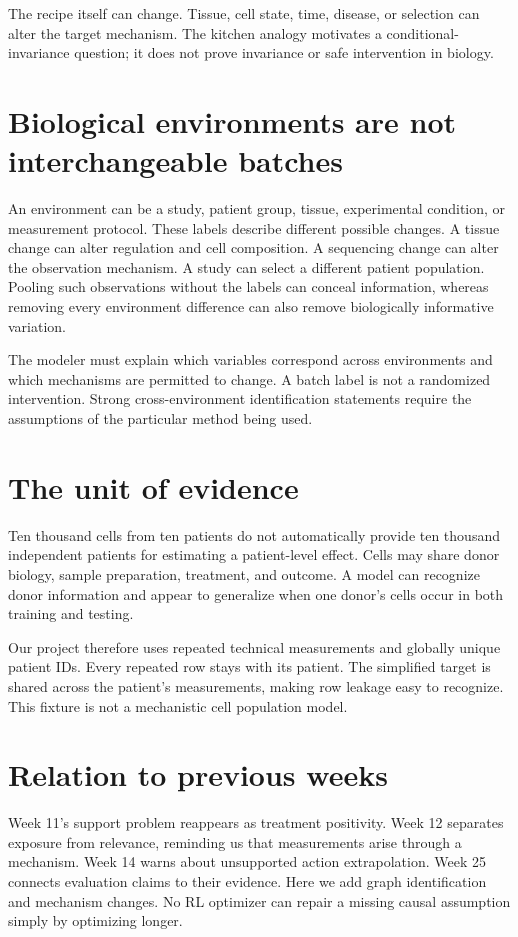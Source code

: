 \documentclass[11pt,oneside]{scrbook}
\begin{document}
\begin{pitfall}
The recipe itself can change. Tissue, cell state, time, disease, or selection can alter
the target mechanism. The kitchen analogy motivates a conditional-invariance question;
it does not prove invariance or safe intervention in biology.
\end{pitfall}

\section{Biological environments are not interchangeable batches}
An environment can be a study, patient group, tissue, experimental condition, or measurement
protocol. These labels describe different possible changes. A tissue change can alter
regulation and cell composition. A sequencing change can alter the observation mechanism.
A study can select a different patient population. Pooling such observations without the
labels can conceal information, whereas removing every environment difference can also
remove biologically informative variation.

The modeler must explain which variables correspond across environments and which
mechanisms are permitted to change. A batch label is not a randomized intervention.
Strong cross-environment identification statements require the assumptions of the particular
method being used.

\section{The unit of evidence}
Ten thousand cells from ten patients do not automatically provide ten thousand independent
patients for estimating a patient-level effect. Cells may share donor biology, sample
preparation, treatment, and outcome. A model can recognize donor information and appear
to generalize when one donor's cells occur in both training and testing.

Our project therefore uses repeated technical measurements and globally unique patient
IDs. Every repeated row stays with its patient. The simplified target is shared across
the patient's measurements, making row leakage easy to recognize. This fixture is not a
mechanistic cell population model.

\section{Relation to previous weeks}
Week 11's support problem reappears as treatment positivity. Week 12 separates exposure
from relevance, reminding us that measurements arise through a mechanism. Week 14 warns
about unsupported action extrapolation. Week 25 connects evaluation claims to their
evidence. Here we add graph identification and mechanism changes. No RL optimizer can
repair a missing causal assumption simply by optimizing longer.
\end{document}

